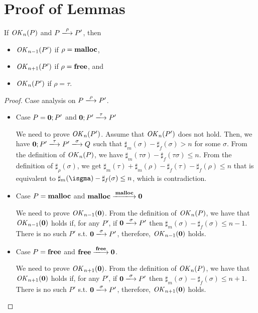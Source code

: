 \section{Proof of Lemmas}
\label{sec:proof}

\begin{lemma}
\label{lem:okPreserved}
If \(\mathit{OK}_n(P)\) and \(P \xlongrightarrow{\rho} P'\), then
\begin{itemize}
\item \(\mathit{OK}_{n-1}(P')\) if \(\rho = \mathbf{malloc}\),
\item \(\mathit{OK}_{n+1}(P')\) if \(\rho = \mathbf{free}\), and
\item \(\mathit{OK}_n(P')\) if \(\rho = \tau\).
\end{itemize}
\end{lemma}
\begin{proof}

Case analysis on \(P \xlongrightarrow{\rho} P'\).

\begin{itemize}
\item Case $P = \mathbf{0};P'$ and \(\TSKIP;P' \xlongrightarrow{\tau} P'\)

  We need to prove \(\mathit{OK}_n(P')\).  Assume that \(\mathit{OK}_n(P')\) does not
  hold. Then, we have \(\TSKIP;P' \xlongrightarrow{\tau} P'
  \xlongrightarrow{\sigma} Q\) such that \(\sharp_{m}(\sigma) -
  \sharp_{f}(\sigma) > n\) for some \(\sigma\).  From the definition
  of \(\mathit{OK}_n(P)\), we have \(\sharp_m(\tau\sigma) - \sharp_f(\tau
  \sigma) \le n \).  From the definition of \(\sharp_\rho(\sigma)\),
  we get \(\sharp_m(\tau) + \sharp_m(\rho) - \sharp_f(\tau) -
  \sharp_f(\rho) \le n\) that is equivalent to \(\sharp_m(\isgma) -
  \sharp_f(\sigma) \le n\), which is contradiction.

\item Case $P = \mathbf{malloc}$ and \(\Malloc
  \xlongrightarrow{\Malloc} \TSKIP\)

  We need to prove \(\mathit{OK}_{n-1}(\mathbf{0})\).  From the definition of
  \(\mathit{OK}_n(P)\), we have that \(\mathit{OK}_{n-1}(\mathbf{0})\) holds if, for any
  \(P'\), if \(\TSKIP \xlongrightarrow{\sigma} P'\) then
  \(\sharp_m(\sigma) - \sharp_f(\sigma) \le n - 1\). There is no such \(P'\) s.t. \(\TSKIP
  \xlongrightarrow{\sigma} P'\), therefore, \(\mathit{OK}_{n-1}(\mathbf{0})\) holds.

  \item Case $P = \mathbf{free}$ and \(\Free \xlongrightarrow{\Free} \TSKIP\).

    We need to prove \(\mathit{OK}_{n+1}(\mathbf{0})\).  From the definition of
  \(\mathit{OK}_n(P)\), we have that \(\mathit{OK}_{n+1}(\mathbf{0})\) holds if, for any
  \(P'\), if \(\TSKIP \xlongrightarrow{\sigma} P'\) then
  \(\sharp_m(\sigma) - \sharp_f(\sigma) \le n + 1\). There is no such \(P'\) s.t. \(\TSKIP
  \xlongrightarrow{\sigma} P'\), therefore, \(\mathit{OK}_{n+1}(\mathbf{0})\) holds.


\end{itemize}
\end{proof}
